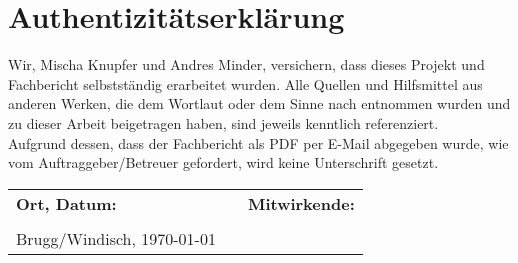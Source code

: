 \chapter{Authentizitätserklärung}

Wir, Mischa Knupfer und Andres Minder, versichern, dass dieses Projekt und Fachbericht selbstständig erarbeitet wurden. Alle Quellen und Hilfsmittel aus anderen Werken, die dem Wortlaut oder dem Sinne nach entnommen wurden und zu dieser Arbeit beigetragen haben, sind jeweils kenntlich referenziert.\\

Aufgrund dessen, dass der Fachbericht als PDF per E-Mail abgegeben wurde, wie vom Auftraggeber/Betreuer gefordert, wird keine Unterschrift gesetzt. \\
\vfill
\begin{center}
\begin{tabular}{p{5cm}p{1cm}l}
\Large\textbf{Ort, Datum:} & & \Large\textbf{Mitwirkende:} \\
\vspace{1cm} & \vspace{1cm} & \vspace{1cm} \\
\Large{Brugg/Windisch, \today} & & \\
\end{tabular}
\end{center}
